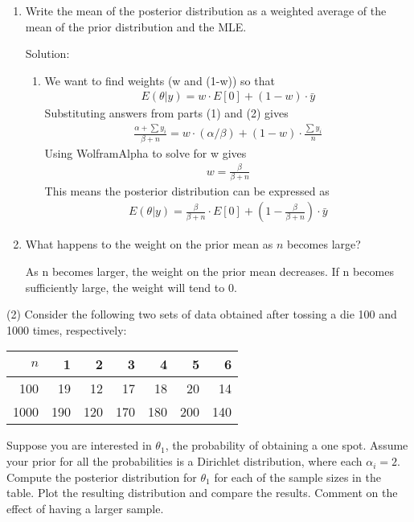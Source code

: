 \documentclass[final,11pt]{article}
\begin{document}
\begin{spacing}{1.25}
\begin{enumerate}
{}

    \item Write the mean of the posterior distribution as a weighted average of the mean of the prior distribution and the MLE.

{\color{blue}
Solution:
\begin{enumerate}
    \item We want to find weights (w and (1-w)) so that
    \begin{gather}
        E(\theta|y) = w \cdot E[0] + (1-w) \cdot \bar{y}
    \end{gather}
    Substituting answers from parts (1) and (2) gives
    \begin{gather}
        \frac {\alpha + \sum y_i}{\beta +n} = w \cdot (\alpha/\beta) + (1-w) \cdot \frac{\sum y_i}{n}
    \end{gather}
    Using WolframAlpha to solve for w gives
    \begin{gather}
         w = \frac{\beta}{\beta +n}
    \end{gather}
    This means the posterior distribution can be expressed as
    \begin{gather}
        E(\theta|y) = \frac{\beta}{\beta +n} \cdot E[0] + (1-\frac{\beta}{\beta +n}) \cdot \bar{y}  
    \end{gather}
\end{enumerate}

}
    \item What happens to the weight on the prior mean as $n$ becomes large?

    As n becomes larger, the weight on the prior mean decreases. If n becomes sufficiently large, the weight will tend to 0.
\end{enumerate}

\newpage

(2) Consider the following two sets of data obtained after tossing a die 100 and 1000 times, respectively:
\begin{center}
    \begin{tabular}{ r r r r r r r }
        \hline
        $n$ & 1 & 2 & 3 & 4 & 5 & 6 \\
        \hline
        100 & 19 & 12 & 17 & 18 & 20 & 14 \\  
        1000 & 190 & 120 & 170 & 180 & 200 & 140 \\
        \hline
    \end{tabular}
\end{center}
Suppose you are interested in $\theta_1$, the probability of obtaining a one spot. Assume your prior for all the probabilities is a Dirichlet distribution, where each $\alpha_i=2$. Compute the posterior distribution for $\theta_1$ for each of the sample sizes in the table. Plot the resulting distribution and compare the results. Comment on the effect of having a larger sample.


\end{spacing}
\end{document}
